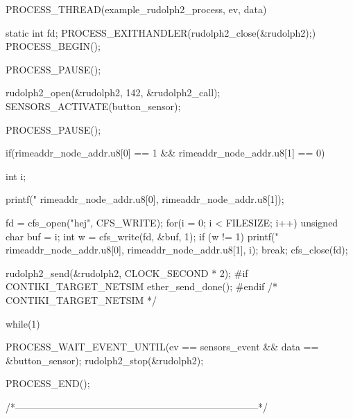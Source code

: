 \begin{DoxyCodeInclude}
PROCESS_THREAD(example_rudolph2_process, ev, data)
{
  static int fd;
  PROCESS_EXITHANDLER(rudolph2_close(&rudolph2);)
  PROCESS_BEGIN();

  PROCESS_PAUSE();

  
  rudolph2_open(&rudolph2, 142, &rudolph2_call);
  SENSORS_ACTIVATE(button_sensor);

  PROCESS_PAUSE();
  
  if(rimeaddr_node_addr.u8[0] == 1 &&
     rimeaddr_node_addr.u8[1] == 0) {
    {
      int i;
      
      printf("%
             rimeaddr_node_addr.u8[0], rimeaddr_node_addr.u8[1]);
      
      fd = cfs_open("hej", CFS_WRITE);
      for(i = 0; i < FILESIZE; i++) {
        unsigned char buf = i;
        int w = cfs_write(fd, &buf, 1);
        if (w != 1) {
          printf("%
               rimeaddr_node_addr.u8[0], rimeaddr_node_addr.u8[1],
               i);
          break;
        }       
      }
      cfs_close(fd);
    }
    rudolph2_send(&rudolph2, CLOCK_SECOND * 2);
#if CONTIKI_TARGET_NETSIM
    ether_send_done();
#endif /* CONTIKI_TARGET_NETSIM */

  }
  
  while(1) {

    PROCESS_WAIT_EVENT_UNTIL(ev == sensors_event &&
                             data == &button_sensor);
    rudolph2_stop(&rudolph2);

  }
  PROCESS_END();
}
/*---------------------------------------------------------------------------*/
\end{DoxyCodeInclude}
 